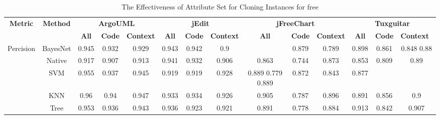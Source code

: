 \begin{table*}[ht]
\scriptsize
\caption{The Effectiveness of Attribute Set for Cloning Instances for free}
\label{cloningsetfree}
\centering
\begin{tabular}{|c|c|c|c|c|c|c|c|c|c|c|c|c|c|}
\hline
\multirow{2}{*}{\textbf{Metric}}&\multirow{2}{*}{\textbf{Method}}&\multicolumn{3}{|c|}{\textbf{ArgoUML}}&\multicolumn{3}{|c|}{\textbf{jEdit}}&\multicolumn{3}{|c|}{\textbf{jFreeChart}}&\multicolumn{3}{|c|}{\textbf{Tuxguitar}}\\
\cline{3-14}
&&\textbf{All}&\textbf{Code}&\textbf{Context}&\textbf{All}&\textbf{Code}&\textbf{Context}&\textbf{All}&\textbf{Code}&\textbf{Context}&\textbf{All}&\textbf{Code}&\textbf{Context}~\\
\hline
\multirow{5}{*}{Percision}
&BayesNet&0.945&	0.932	&0.929&		0.943&	0.942	&0.9	&	&0.879	&0.789	&0.898		&0.861	&0.848	0.88\\
&Native&0.917	&0.907&	0.913	&	0.941	&0.932&	0.906	&	0.863&	0.744&	0.873	&	0.853&	0.809	&0.89\\
&SVM&0.955&	0.937	&0.945	&	0.919	&0.919&	0.928&		0.889	0.779	0.889	&	0.872	&0.843	&0.877\\
&KNN&0.96	&0.94	&0.947	&	0.933&	0.934	&0.926	&	0.905&	0.787&	0.896	&	0.891&	0.856&	0.9\\
&Tree&0.953&	0.936	&0.943	&	0.936&	0.923	&0.921&		0.891&	0.778&	0.884	&	0.913	&0.842&	0.907\\


\end{tabular}
\end{table*}
